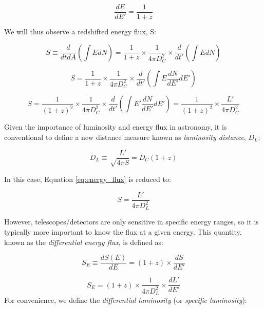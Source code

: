 \begin{equation}
\frac{dE}{dE'} = \frac{1}{1+z}
\label{eq:de}
\end{equation}

We will thus observe a redshifted energy flux, S:

\begin{equation}
S \equiv \frac{d}{dtdA} \left( \int E dN \right) = \frac{1}{1+z} \times \frac{1}{4 \pi D_{C}^{2}} \times \frac{d}{dt'} \left( \int E dN \right)
\end{equation}

\begin{equation}
S = \frac{1}{1+z} \times \frac{1}{4 \pi D_{C}^{2}} \times \frac{d}{dt'} \left( \int E \frac{dN}{dE'} dE' \right)
\end{equation}

\begin{equation}
S = \frac{1}{(1+z)^{2}} \times \frac{1}{4 \pi D_{C}^{2}} \times \frac{d}{dt'} \left( \int E' \frac{dN}{dE'} dE' \right) =  \frac{1}{(1+z)^{2}} \times \frac{L'}{4 \pi D_{C}^{2}}
\label{eq:energy_flux}
\end{equation}

Given the importance of luminosity and energy flux in astronomy, it is conventional to define a new distance measure known as \emph{luminosity distance}, $D_{L}$:

\begin{equation}
D_{L} \equiv \sqrt\frac{L'}{4 \pi S} = D_{C}(1+z)
\end{equation}

In this case, Equation \ref{eq:energy_flux} is reduced to:

\begin{equation}
S = \frac{L'}{4 \pi D_{L}^{2}}
\end{equation}

However, telescopes/detectors are only sensitive in specific energy ranges, so it is typically more important to know the flux at a given energy. This quantity, known as the \emph{differential energy flux}, is defined as:

\begin{equation}
S_{E} \equiv \frac{dS(E)}{dE} = (1+z) \times \frac{dS}{dE'}
\end{equation}

\begin{equation}
S_{E} = (1+z) \times \frac{1}{4 \pi D_{L}^{2}} \times \frac{dL'}{dE'}
\end{equation}
For convenience, we define the \emph{differential luminosity} (or \emph{specific luminosity}):

